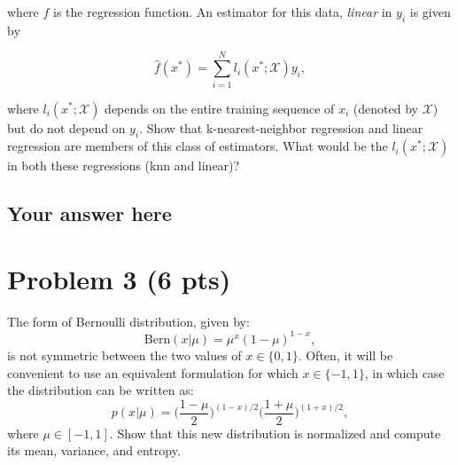 \documentclass{article}
\begin{document}
where $f$ is the regression function. An estimator for this data, \emph{linear} in $y_i$ is given by

\begin{equation}
    \hat f(x^*) = \sum_{i=1}^{N} l_i(x^* ; \mathcal{X})y_i, 
\end{equation}

where $l_i(x^*; \mathcal{X})$ depends on the entire training sequence of $x_i$ (denoted by $\mathcal{X}$)  but do not depend on $y_i$. Show that k-nearest-neighbor regression and linear regression are members of this class of estimators. What would be the $l_i(x^* ; \mathcal{X})$ in both these regressions (knn and linear)? 


\subsection*{Your answer here}



\section*{Problem 3 (6 pts)}

The form of Bernoulli distribution, given by:
\begin{equation}
\textrm{Bern}(x | \mu) = \mu^x (1-\mu)^{1-x},
\nonumber
\end{equation}
is not symmetric between the two values of $x\in \{0,1\}$. Often, it will be
convenient to use an equivalent formulation for which $x \in \{-1,1\}$, in which case
the distribution can be written as:
\begin{equation}
 p(x | \mu) = \bigg(\frac{1-\mu}{2}\bigg)^{(1-x)/2}
  \bigg(\frac{1+\mu}{2}\bigg)^{(1+x)/2},
\nonumber
\end{equation}
where $\mu \in [-1,1]$. Show that this new distribution is normalized and compute
its mean, variance, and entropy.
\end{document}

